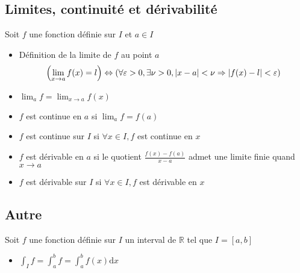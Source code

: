\documentclass[11pt,colorlinks]{book}
\theoremstyle{mytheoremstyle}
\theoremstyle{mytheoremstyle}
\theoremstyle{mytheoremstyle}
\theoremstyle{mytheoremstyle}
\theoremstyle{mytheoremstyle}
\theoremstyle{mytheoremstyle}
\theoremstyle{mytheoremstyle}
\theoremstyle{mytheoremstyle}
\theoremstyle{myproblemstyle}
\def\mbb#1{\mathbb{#1}}
\def\bR{\mbb{R}}
\begin{document}
\subsection{Limites, continuité et dérivabilité}
\begin{rmq}
  Soit $f$ une fonction définie sur $I$ et $a \in I$
  \begin{itemize}
    \item Définition de la limite de $f$ au point $a$
    \begin{equation*}
      \left(\lim_{x \to a} f(x) = l\right) \Leftrightarrow \left(\forall \varepsilon > 0, \exists 
      \nu > 0, \abs{x-a} < \nu \Rightarrow \abs{f(x) - l} < \varepsilon\right)
    \end{equation*}
    \item $\lim_a f = \lim_{x \to a} f(x)$ 
    \item $f$ est continue en $a$ si $\lim_a f = f(a)$ 
    \item $f$ est continue sur $I$ si $\forall x \in I, f$ est continue en $x$
    \item $f$ est dérivable en $a$ si le quotient $\frac{f(x) - f(a)}{x - a}$ admet une limite finie quand $x \to a$
    \item $f$ est dérivable sur $I$ si $\forall x \in I, f$ est dérivable en $x$
  \end{itemize}
\end{rmq}
\subsection{Autre}
\begin{rmq}
  Soit $f$ une fonction définie sur $I$ un interval de $\bR$ tel que $I = [a,b]$
  \begin{itemize}
    \item $\int_I f = \int_a^b f = \int_a^b f(x) \text{d}x$
  \end{itemize}
\end{rmq}
\end{document}
